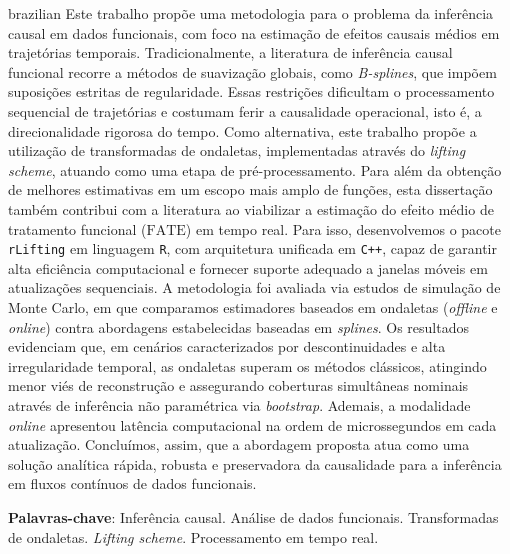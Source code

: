 \setlength{\absparsep}{18pt} %
\begin{resumo}[Resumo]
 \begin{otherlanguage*}{brazilian}
    Este trabalho propõe uma metodologia para o problema da inferência causal em dados funcionais, com foco na estimação de efeitos causais médios em trajetórias temporais. Tradicionalmente, a literatura de inferência causal funcional recorre a métodos de suavização globais, como \emph{B-splines}, que impõem suposições estritas de regularidade. Essas restrições dificultam o processamento sequencial de trajetórias e costumam ferir a causalidade operacional, isto é, a direcionalidade rigorosa do tempo. Como alternativa, este trabalho propõe a utilização de transformadas de ondaletas, implementadas através do \emph{lifting scheme}, atuando como uma etapa de pré-processamento. Para além da obtenção de melhores estimativas em um escopo mais amplo de funções, esta dissertação também contribui com a literatura ao viabilizar a estimação do efeito médio de tratamento funcional (\(\mathrm{FATE}\)) em tempo real. Para isso, desenvolvemos o pacote \texttt{rLifting} em linguagem \texttt{R}, com arquitetura unificada em \texttt{C++}, capaz de garantir alta eficiência computacional e fornecer suporte adequado a janelas móveis em atualizações sequenciais. A metodologia foi avaliada via estudos de simulação de Monte Carlo, em que comparamos estimadores baseados em ondaletas (\emph{offline} e \emph{online}) contra abordagens estabelecidas baseadas em \emph{splines}. Os resultados evidenciam que, em cenários caracterizados por descontinuidades e alta irregularidade temporal, as ondaletas superam os métodos clássicos, atingindo menor viés de reconstrução e assegurando coberturas simultâneas nominais através de inferência não paramétrica via \emph{bootstrap}. Ademais, a modalidade \emph{online} apresentou latência computacional na ordem de microssegundos em cada atualização. Concluímos, assim, que a abordagem proposta atua como uma solução analítica rápida, robusta e preservadora da causalidade para a inferência em fluxos contínuos de dados funcionais.

    \textbf{Palavras-chave}: Inferência causal. Análise de dados funcionais. Transformadas de ondaletas. \emph{Lifting scheme}. Processamento em tempo real.
 \end{otherlanguage*}
\end{resumo}
